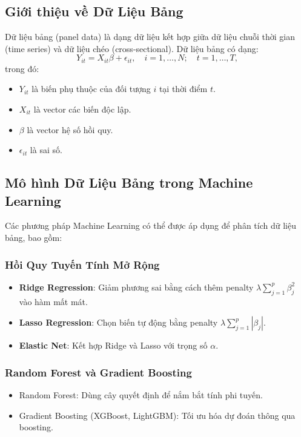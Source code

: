 \subsection{Giới thiệu về Dữ Liệu Bảng}
Dữ liệu bảng (panel data) là dạng dữ liệu kết hợp giữa dữ liệu chuỗi thời gian (time series) và dữ liệu chéo (cross-sectional). Dữ liệu bảng có dạng:
\begin{equation}
Y_{it} = X_{it} \beta + \epsilon_{it}, \quad i = 1, \dots, N; \quad t = 1, \dots, T,
\end{equation}
trong đó:
\begin{itemize}
    \item $Y_{it}$ là biến phụ thuộc của đối tượng $i$ tại thời điểm $t$.
    \item $X_{it}$ là vector các biến độc lập.
    \item $\beta$ là vector hệ số hồi quy.
    \item $\epsilon_{it}$ là sai số.
\end{itemize}

\subsection{Mô hình Dữ Liệu Bảng trong Machine Learning}
Các phương pháp Machine Learning có thể được áp dụng để phân tích dữ liệu bảng, bao gồm:
\subsubsection{Hồi Quy Tuyến Tính Mở Rộng}
\begin{itemize}
    \item \textbf{Ridge Regression}: Giảm phương sai bằng cách thêm penalty $\lambda \sum_{j=1}^{p} \beta_j^2$ vào hàm mất mát.
    \item \textbf{Lasso Regression}: Chọn biến tự động bằng penalty $\lambda \sum_{j=1}^{p} |\beta_j|$.
    \item \textbf{Elastic Net}: Kết hợp Ridge và Lasso với trọng số $\alpha$.
\end{itemize}

\subsubsection{Random Forest và Gradient Boosting}
\begin{itemize}
    \item Random Forest: Dùng cây quyết định để nắm bắt tính phi tuyến.
    \item Gradient Boosting (XGBoost, LightGBM): Tối ưu hóa dự đoán thông qua boosting.
\end{itemize}

